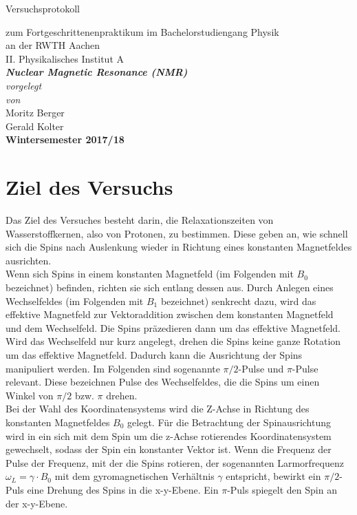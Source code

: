 \documentclass[12pt,a4paper]{article}
\author{Gerald}
\begin{document}
	\setlength{\parindent}{0pt} 
	\begin{center}
		{\LARGE Versuchsprotokoll}\\
		\begin{large}
			zum Fortgeschrittenenpraktikum im Bachelorstudiengang Physik\\[0.4cm]
			an der RWTH Aachen\\
			II. Physikalisches Institut A\\[5.5cm]
			\Large\textbf{\textsl{Nuclear Magnetic Resonance (NMR)}}\\[5.5cm]
			\normalsize\textit{vorgelegt\\von}\\[0.4cm]
			\large{Moritz Berger\\Gerald Kolter}\\[2cm]
			\large \textbf{Wintersemester 2017/18}
		\end{large}
	\end{center}
	\newpage
	
	\tableofcontents
	\newpage

\section{Ziel des Versuchs}
Das Ziel des Versuches besteht darin, die Relaxationszeiten von Wasserstoffkernen, also von Protonen, zu bestimmen. Diese geben an, wie schnell sich die Spins nach Auslenkung wieder in Richtung eines konstanten Magnetfeldes ausrichten.\\
Wenn sich Spins in einem konstanten Magnetfeld (im Folgenden mit $B_0$ bezeichnet) befinden, richten sie sich entlang dessen aus. Durch Anlegen eines Wechselfeldes (im Folgenden mit $B_1$ bezeichnet) senkrecht dazu, wird das effektive Magnetfeld zur Vektoraddition zwischen dem konstanten Magnetfeld und dem Wechselfeld. Die Spins präzedieren dann um das effektive Magnetfeld. Wird das Wechselfeld nur kurz angelegt, drehen die Spins keine ganze Rotation um das effektive Magnetfeld. Dadurch kann die Ausrichtung der Spins manipuliert werden. Im Folgenden sind sogenannte $\pi /2$-Pulse und $\pi$-Pulse relevant. Diese bezeichnen Pulse des Wechselfeldes, die die Spins um einen Winkel von $\pi /2$ bzw. $\pi$ drehen.\\
Bei der Wahl des Koordinatensystems wird die Z-Achse in Richtung des konstanten Magnetfeldes $B_0$ gelegt. Für die Betrachtung der Spinausrichtung wird in ein sich mit dem Spin um die z-Achse rotierendes Koordinatensystem gewechselt, sodass der Spin ein konstanter Vektor ist. Wenn die Frequenz der Pulse der Frequenz, mit der die Spins rotieren, der sogenannten Larmorfrequenz $\omega _L = \gamma \cdot B_0$ mit dem gyromagnetischen Verhältnis $\gamma$ entspricht, bewirkt ein $\pi /2$-Puls eine Drehung des Spins in die x-y-Ebene. Ein $\pi$-Puls spiegelt den Spin an der x-y-Ebene.
\end{document}
